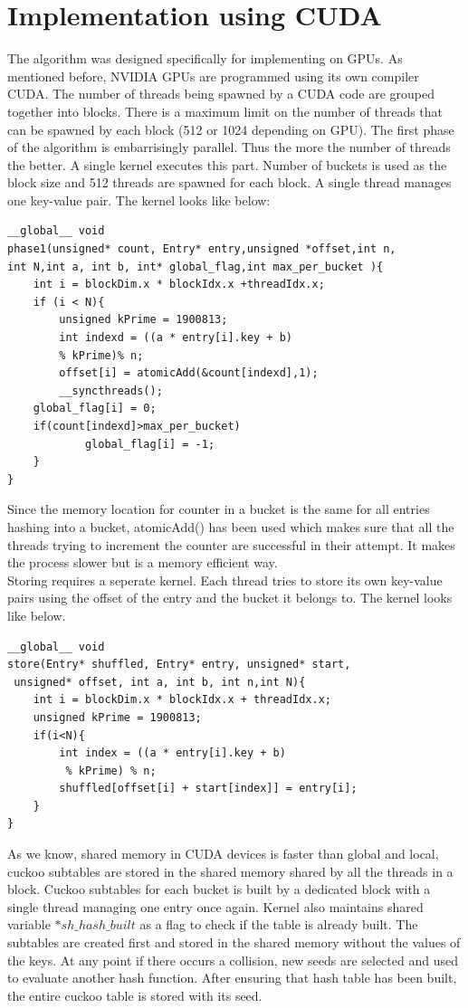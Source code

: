 \documentclass[a4paper,12pt]{report}
\begin{document}
\section{Implementation using CUDA}
The algorithm was designed specifically for implementing on GPUs. 
As mentioned before, NVIDIA GPUs are programmed using its own compiler CUDA.
 The number of threads being spawned by a CUDA code are grouped together into blocks.
 There is a maximum limit on the number of threads that can be spawned by each block (512 or 1024 depending on GPU). 
The first phase of the algorithm is embarrisingly parallel. Thus the more the number of threads the better. 
A single kernel executes this part. Number of buckets is used as the block size and 512 threads are 
spawned for each block. A single thread manages one key-value pair. The kernel looks like below:
\begin{lstlisting}
__global__ void
phase1(unsigned* count, Entry* entry,unsigned *offset,int n,
int N,int a, int b, int* global_flag,int max_per_bucket ){
	int i = blockDim.x * blockIdx.x +threadIdx.x;
	if (i < N){
		unsigned kPrime = 1900813;
		int indexd = ((a * entry[i].key + b)
		% kPrime)% n;
		offset[i] = atomicAdd(&count[indexd],1);	
		__syncthreads();
	global_flag[i] = 0;		
	if(count[indexd]>max_per_bucket)
			global_flag[i] = -1;
	}
}
\end{lstlisting}
Since the memory location for counter in a bucket is the same for all entries hashing into a bucket, atomicAdd() has been used which makes sure that all the threads trying to increment the counter are successful in their attempt. It makes the process slower but is a memory efficient way.\\
Storing requires a seperate kernel. Each thread tries to store its own key-value pairs using the offset of the entry and the bucket it belongs to. The kernel looks like below.
\begin{lstlisting}
__global__ void
store(Entry* shuffled, Entry* entry, unsigned* start,
 unsigned* offset, int a, int b, int n,int N){
	int i = blockDim.x * blockIdx.x + threadIdx.x;
	unsigned kPrime = 1900813;
	if(i<N){
		int index = ((a * entry[i].key + b)
		 % kPrime) % n;
		shuffled[offset[i] + start[index]] = entry[i];
	}
}
\end{lstlisting}
As we know, shared memory in CUDA devices is faster than global and local, cuckoo subtables are stored in the shared memory shared by all the threads in a block. Cuckoo subtables for each bucket is built by a dedicated block with a single thread managing one entry once again. Kernel also maintains shared variable $*sh \_ hash \_ built$ as a flag to check if the table is already built. The subtables are created first and stored in the shared memory without the values of the keys. At any point if there occurs a collision, new seeds are selected and used to evaluate another hash function. After ensuring that hash table has been built, the entire cuckoo table is stored with its seed. 
\end{document}
